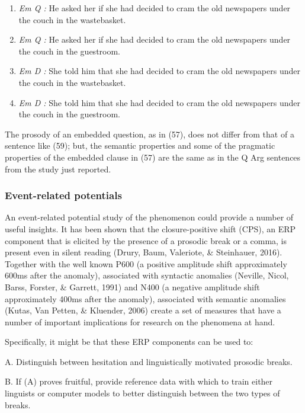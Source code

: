 \documentclass[12pt,oneside]{book}
\begin{document}
\begin{enumerate}
\def\labelenumi{(\arabic{enumi})}
\setcounter{enumi}{56}
\item
  \emph{Em Q :} He asked her if she had decided to cram the old newspapers under the couch in the wastebasket.
\item
  \emph{Em Q :} He asked her if she had decided to cram the old newspapers under the couch in the guestroom.
\item
  \emph{Em D :} She told him that she had decided to cram the old newspapers under the couch in the wastebasket.
\item
  \emph{Em D :} She told him that she had decided to cram the old newspapers under the couch in the guestroom.
\end{enumerate}

The prosody of an embedded question, as in (57), does not differ from that of a sentence like (59); but, the semantic properties and some of the pragmatic properties of the embedded clause in (57) are the same as in the Q Arg sentences from the study just reported.

\hypertarget{erp}{%
\subsubsection{Event-related potentials}\label{erp}}

An event-related potential study of the phenomenon could provide a number of useful insights. It has been shown that the closure-positive shift (CPS), an ERP component that is elicited by the presence of a prosodic break or a comma, is present even in silent reading (Drury, Baum, Valeriote, \& Steinhauer, 2016). Together with the well known P600 (a positive amplitude shift approximately 600ms after the anomaly), associated with syntactic anomalies (Neville, Nicol, Barss, Forster, \& Garrett, 1991) and N400 (a negative amplitude shift approximately 400ms after the anomaly), associated with semantic anomalies (Kutas, Van Petten, \& Kluender, 2006) create a set of measures that have a number of important implications for research on the phenomena at hand.

Specifically, it might be that these ERP components can be used to:

A. Distinguish between hesitation and linguistically motivated prosodic breaks.

B. If (A) proves fruitful, provide reference data with which to train either linguists or computer models to better distinguish between the two types of breaks.
\end{document}
